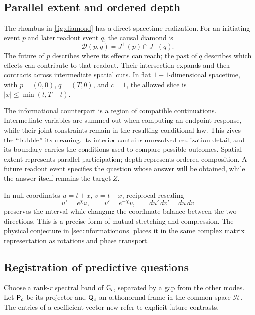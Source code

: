 \subsection{Parallel extent and ordered depth}
The rhombus in \cref{fig:diamond} has a direct spacetime realization. For an initiating event \(p\) and later readout event \(q\), the causal diamond is
\begin{equation}
\mathcal D(p,q)=J^+(p)\cap J^-(q).
\label{eq:diamond}
\end{equation}
The future of \(p\) describes where its effects can reach; the past of \(q\) describes which effects can contribute to that readout. Their intersection expands and then contracts across intermediate spatial cuts. In flat \(1+1\)-dimensional spacetime, with \(p=(0,0)\), \(q=(T,0)\), and \(c=1\), the allowed slice is \(|x|\le\min(t,T-t)\).

The informational counterpart is a region of compatible continuations. Intermediate variables are summed out when computing an endpoint response, while their joint constraints remain in the resulting conditional law. This gives the ``bubble'' its meaning: its interior contains unresolved realization detail, and its boundary carries the conditions used to compare possible outcomes. Spatial extent represents parallel participation; depth represents ordered composition. A future readout event specifies the question whose answer will be obtained, while the answer itself remains the target \(Z\).

In null coordinates \(u=t+x\), \(v=t-x\), reciprocal rescaling
\begin{equation}
u'=e^\chi u,\qquad v'=e^{-\chi}v,
\qquad du'\,dv'=du\,dv
\label{eq:squeeze}
\end{equation}
preserves the interval while changing the coordinate balance between the two directions. This is a precise form of mutual stretching and compression. The physical conjecture in \cref{sec:informationons} places it in the same complex matrix representation as rotations and phase transport.

\subsection{Registration of predictive questions}
Choose a rank-\(r\) spectral band of \(\mathsf G_c\), separated by a gap from the other modes. Let \(\mathsf P_c\) be its projector and \(\mathsf Q_c\) an orthonormal frame in the common space \(\mathcal H\). The entries of a coefficient vector now refer to explicit future contrasts.

